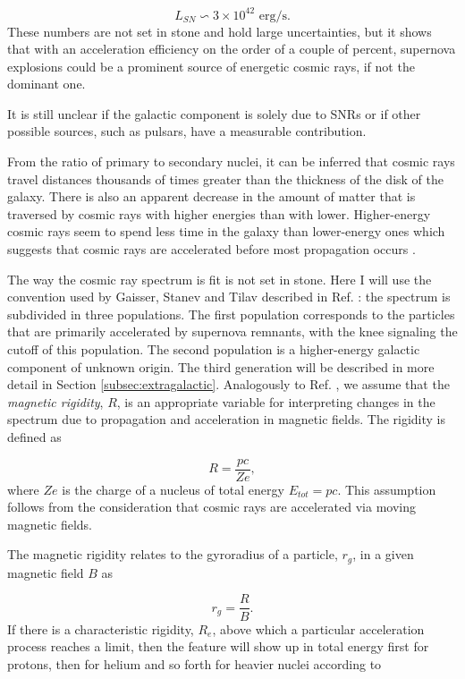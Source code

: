 \begin{equation}
L_{SN} \backsim 3 \times 10^{42} \textrm{ erg/s}.
\end{equation}
These numbers are not set in stone and hold large uncertainties, but it shows that with an acceleration efficiency on the order of a couple of percent, supernova explosions could be a prominent source of energetic cosmic rays, if not the dominant one.

It is still unclear if the galactic component is solely due to SNRs or if other possible sources, such as pulsars, have a measurable contribution.

From the ratio of primary to secondary nuclei, it can be inferred that cosmic rays travel distances thousands of times greater than the thickness of the disk of the galaxy. There is also an apparent decrease in the amount of matter that is traversed by cosmic rays with higher energies than with lower. Higher-energy cosmic rays seem to spend less time in the galaxy than lower-energy ones which suggests that cosmic rays are accelerated before most propagation occurs \cite{Gaisser:2016uoy}.

The way the cosmic ray spectrum is fit is not set in stone. Here I will use the convention used by Gaisser, Stanev and Tilav described in Ref. \cite{Gaisser:2013bla}: the spectrum is subdivided in three populations. The first population corresponds to the particles that are primarily accelerated by supernova remnants, with the knee signaling the cutoff of this population. The second population is a higher-energy galactic component of unknown origin. The third generation will be described in more detail in Section \ref{subsec:extragalactic}. Analogously to Ref. \cite{Gaisser:2013bla}, we assume that the \textit{magnetic rigidity}, $R$, is an appropriate variable for interpreting changes in the spectrum due to propagation and acceleration in magnetic fields. The rigidity is defined as

\begin{equation}
R = \frac{pc}{Ze},
\end{equation}
where $Ze$ is the charge of a nucleus of total energy $E_{tot} = pc$. This assumption follows from the consideration that cosmic rays are accelerated via moving magnetic fields. 

The magnetic rigidity relates to the gyroradius of a particle, $r_g$, in a given magnetic field $B$ as

\begin{equation}
\label{eq:gyro}
r_g = \frac{R}{B}.
\end{equation}
If there is a characteristic rigidity, $R_e$, above which a particular acceleration process reaches a limit, then the feature will show up in total energy first for protons, then for helium and so forth for heavier nuclei according to

